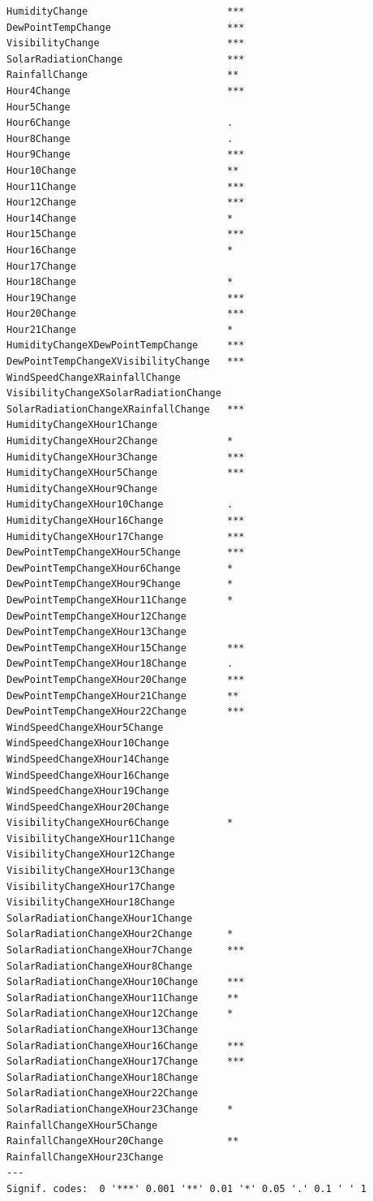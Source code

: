\documentclass[
  letterpaper,
  DIV=11,
  numbers=noendperiod]{scrartcl}
\begin{document}
\begin{verbatim}
HumidityChange                        ***
DewPointTempChange                    ***
VisibilityChange                      ***
SolarRadiationChange                  ***
RainfallChange                        ** 
Hour4Change                           ***
Hour5Change                              
Hour6Change                           .  
Hour8Change                           .  
Hour9Change                           ***
Hour10Change                          ** 
Hour11Change                          ***
Hour12Change                          ***
Hour14Change                          *  
Hour15Change                          ***
Hour16Change                          *  
Hour17Change                             
Hour18Change                          *  
Hour19Change                          ***
Hour20Change                          ***
Hour21Change                          *  
HumidityChangeXDewPointTempChange     ***
DewPointTempChangeXVisibilityChange   ***
WindSpeedChangeXRainfallChange           
VisibilityChangeXSolarRadiationChange    
SolarRadiationChangeXRainfallChange   ***
HumidityChangeXHour1Change               
HumidityChangeXHour2Change            *  
HumidityChangeXHour3Change            ***
HumidityChangeXHour5Change            ***
HumidityChangeXHour9Change               
HumidityChangeXHour10Change           .  
HumidityChangeXHour16Change           ***
HumidityChangeXHour17Change           ***
DewPointTempChangeXHour5Change        ***
DewPointTempChangeXHour6Change        *  
DewPointTempChangeXHour9Change        *  
DewPointTempChangeXHour11Change       *  
DewPointTempChangeXHour12Change          
DewPointTempChangeXHour13Change          
DewPointTempChangeXHour15Change       ***
DewPointTempChangeXHour18Change       .  
DewPointTempChangeXHour20Change       ***
DewPointTempChangeXHour21Change       ** 
DewPointTempChangeXHour22Change       ***
WindSpeedChangeXHour5Change              
WindSpeedChangeXHour10Change             
WindSpeedChangeXHour14Change             
WindSpeedChangeXHour16Change             
WindSpeedChangeXHour19Change             
WindSpeedChangeXHour20Change             
VisibilityChangeXHour6Change          *  
VisibilityChangeXHour11Change            
VisibilityChangeXHour12Change            
VisibilityChangeXHour13Change            
VisibilityChangeXHour17Change            
VisibilityChangeXHour18Change            
SolarRadiationChangeXHour1Change         
SolarRadiationChangeXHour2Change      *  
SolarRadiationChangeXHour7Change      ***
SolarRadiationChangeXHour8Change         
SolarRadiationChangeXHour10Change     ***
SolarRadiationChangeXHour11Change     ** 
SolarRadiationChangeXHour12Change     *  
SolarRadiationChangeXHour13Change        
SolarRadiationChangeXHour16Change     ***
SolarRadiationChangeXHour17Change     ***
SolarRadiationChangeXHour18Change        
SolarRadiationChangeXHour22Change        
SolarRadiationChangeXHour23Change     *  
RainfallChangeXHour5Change               
RainfallChangeXHour20Change           ** 
RainfallChangeXHour23Change              
---
Signif. codes:  0 '***' 0.001 '**' 0.01 '*' 0.05 '.' 0.1 ' ' 1


\end{verbatim}
\end{document}
